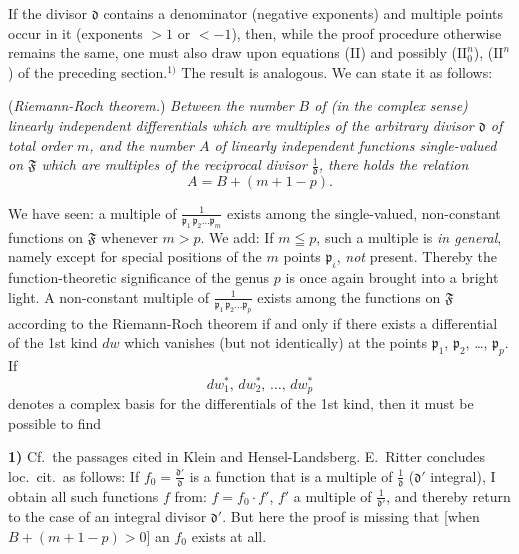 \documentclass{article}
\begin{document}
If the divisor $\mathfrak{d}$ contains a denominator (negative exponents) and multiple points occur in it (exponents $> 1$ or $< -1$), then, while the proof procedure otherwise remains the same, one must also draw upon equations (II) and possibly ($\mathrm{II}_0^n$), ($\mathrm{II}^n$) of the preceding section.${}^{1)}$ The result is analogous. We can state it as follows:

(\emph{Riemann-Roch theorem.}) \emph{Between the number $B$ of (in the complex sense) linearly independent differentials which are multiples of the arbitrary divisor $\mathfrak{d}$ of total order $m$, and the number $A$ of linearly independent functions single-valued on $\mathfrak{F}$ which are multiples of the reciprocal divisor $\frac{1}{\mathfrak{d}}$, there holds the relation}
\[ A = B + (m + 1 - p). \]

We have seen: a multiple of $\frac{1}{\mathfrak{p}_1 \, \mathfrak{p}_2 \dots \mathfrak{p}_m}$ exists among the single-valued, non-constant functions on $\mathfrak{F}$ whenever $m > p$. We add: If $m \leqq p$, such a multiple is \emph{in general}, namely except for special positions of the $m$ points $\mathfrak{p}_\iota$, \emph{not} present. Thereby the function-theoretic significance of the genus $p$ is once again brought into a bright light. A non-constant multiple of $\frac{1}{\mathfrak{p}_1 \, \mathfrak{p}_2 \dots \mathfrak{p}_p}$ exists among the functions on $\mathfrak{F}$ according to the Riemann-Roch theorem if and only if there exists a differential of the 1st kind $dw$ which vanishes (but not identically) at the points $\mathfrak{p}_1$, $\mathfrak{p}_2$, \dots, $\mathfrak{p}_p$. If
\[ dw_1^*, \, dw_2^*, \, \dots, \, dw_p^* \]
denotes a complex basis for the differentials of the 1st kind, then it must be possible to find

\textbf{1)} Cf.\ the passages cited in Klein and Hensel-Landsberg. E.~Ritter concludes loc.\ cit.\ as follows: If $f_0 = \frac{\mathfrak{d}'}{\mathfrak{d}}$ is a function that is a multiple of $\frac{1}{\mathfrak{d}}$ ($\mathfrak{d}'$ integral), I obtain all such functions $f$ from: $f = f_0 \cdot f'$, $f'$ a multiple of $\frac{1}{\mathfrak{d}'}$, and thereby return to the case of an integral divisor $\mathfrak{d}'$. But here the proof is missing that [when $B + (m + 1 - p) > 0$] an $f_0$ exists at all.
\end{document}
